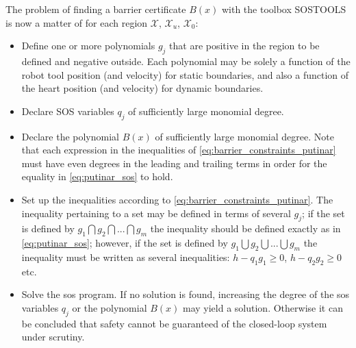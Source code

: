 The problem of finding a barrier certificate $B(x)$ with the toolbox SOSTOOLS is now a matter of for each region $\mathcal{X}$, $\mathcal{X}_u$, $\mathcal{X}_0$:
\begin{itemize}
\item Define one or more polynomials $g_j$ that are positive in the region to be defined and negative outside. Each polynomial may be solely a function of the robot tool position (and velocity) for static boundaries, and also a function of the heart position (and velocity) for dynamic boundaries.
\item Declare SOS variables $q_j$ of sufficiently large monomial degree.
\item Declare the polynomial $B(x)$ of sufficiently large monomial degree. Note that each expression in the inequalities of \autoref{eq:barrier_constraints_putinar} must have even degrees in the leading and trailing terms in order for the equality in \autoref{eq:putinar_sos} to hold.
\item Set up the inequalities according to \autoref{eq:barrier_constraints_putinar}. The inequality pertaining to a set may be defined in terms of several $g_j$; if the set is defined by $g_1 \bigcap g_2 \bigcap ... \bigcap g_m$ the inequality should be defined exactly as in \autoref{eq:putinar_sos}; however, if the set is defined by $g_1 \bigcup g_2 \bigcup ... \bigcup g_m$ the inequality must be written as several inequalities: $h - q_1g_1\geq 0$, $h - q_2g_2\geq 0$ etc.
\item Solve the \gls{sos} program. If no solution is found, increasing the degree of the \gls{sos} variables $q_j$ or the polynomial $B(x)$ may yield a solution. Otherwise it can be concluded that safety cannot be guaranteed of the closed-loop system under scrutiny.
\end{itemize}





 
	





